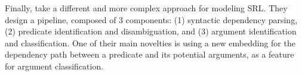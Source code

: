   Finally,  take a different and more complex approach for modeling SRL.
  They design a pipeline, composed of 3 components: (1) syntactic dependency parsing,
  (2) predicate identification and disambiguation, and (3) argument identification and classification.
  One of their main novelties is using a new embedding for the dependency path between a predicate
  and its potential arguments, as a feature for argument classification.








